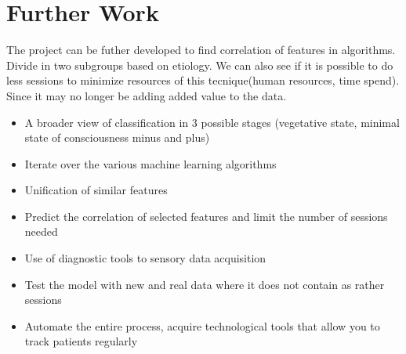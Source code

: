 \section{Further Work}



The project can be futher developed to find correlation of features in algorithms. Divide in two subgroups based on etiology. We can also see if it is possible to do less sessions to minimize resources of this tecnique(human resources, time spend). Since it may no longer be adding added value to the data.
\begin{itemize}
\item A broader view of classification in 3 possible stages (vegetative state, minimal state of consciousness minus and plus)
\item Iterate over the various machine learning algorithms
\item Unification of similar features \cite{9202409}
\item Predict the correlation of selected features and limit the number of sessions needed
\item Use of diagnostic tools to sensory data acquisition
\item Test the model with new and real data where it does not contain as rather sessions
\item Automate the entire process, acquire technological tools that allow you to track patients regularly
\end{itemize}


\vspace*{12mm}


